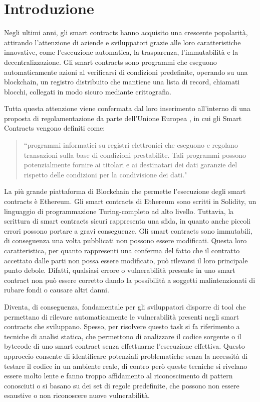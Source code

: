 \documentclass[../../Thesis.tex]{subfiles}
\begin{document}
\chapter{Introduzione}
Negli ultimi anni, gli smart contracts hanno acquisito una crescente popolarità, attirando l'attenzione di aziende e sviluppatori grazie alle loro caratteristiche innovative, come l'esecuzione automatica, la trasparenza, l'immutabilità e la decentralizzazione. Gli smart contracts sono programmi che eseguono automaticamente azioni al verificarsi di condizioni predefinite, operando su una blockchain, un registro distribuito che mantiene una lista di record, chiamati blocchi, collegati in modo sicuro mediante crittografia.

Tutta questa attenzione viene confermata dal loro inserimento all'interno di una proposta di regolamentazione da parte dell'Unione Europea \cite{DataAct}, in cui gli Smart Contracts vengono definiti come: 
\begin{quotation}
    ``programmi informatici su registri elettronici che eseguono e regolano transazioni sulla base di condizioni prestabilite. Tali programmi possono potenzialmente fornire ai titolari e ai destinatari dei dati garanzie del rispetto delle condizioni per la condivisione dei dati."
\end{quotation}


La più grande piattaforma di Blockchain che permette l'esecuzione degli smart contracts è Ethereum. Gli smart contracts di Ethereum sono scritti in Solidity, un linguaggio di programmazione Turing-completo ad alto livello. Tuttavia, la scrittura di smart contracts sicuri rappresenta una sfida, in quanto anche piccoli errori possono portare a gravi conseguenze. Gli smart contracts sono immutabili, di conseguenza una volta pubblicati non possono essere modificati. Questa loro caratteristica, per quanto rappresenti una conferma del fatto che il contratto accettato dalle parti non possa essere modificato, può rilevarsi il loro principale punto debole. Difatti, qualsiasi errore o vulnerabilità presente in uno smart contract non può essere corretto dando la possibilità a soggetti malintenzionati di rubare fondi o causare altri danni.

Diventa, di conseguenza, fondamentale per gli sviluppatori disporre di tool che permettano di rilevare automaticamente le vulnerabilità presenti negli smart contracts che sviluppano. Spesso, per risolvere questo task si fa riferimento a tecniche di analisi statica, che permettono di analizzare il codice sorgente o il bytecode di uno smart contract senza effettuarne l'esecuzione effettiva. Questo approccio consente di identificare potenziali problematiche senza la necessità di testare il codice in un ambiente reale, di contro però queste tecniche si rivelano essere molto lente e fanno troppo affidamento al riconoscimento di pattern conosciuti o si basano su dei set di regole predefinite, che possono non essere esaustive o non riconoscere nuove vulnerabilità. 
\end{document}
